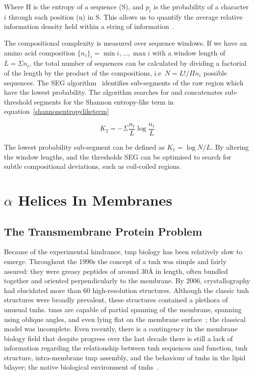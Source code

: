 Where H is the entropy of a sequence (S), and $p_i$ is the probability of a character $i$ through each position (n) in S. This allows us to quantify the average relative information density held within a string of information~\cite{Shannon1948}.

The compositional complexity is measured over sequence windows. If we have an amino acid composition $\{{{n}_{i}}{\}}_{i}={\min{i}},\ldots,{\max{i}}$ with a window length of $L=\Sigma {n}_i $, the total number of sequences can be calculated by dividing a factorial of the length by the product of the compositions, i.e\  $ N = L!/\Pi{n}_i $ possible sequences.
The SEG algorithm~\cite{WOOTTON1994269, Wootton1996} identifies sub-segments of the raw region which have the lowest probability.
The algorithm searches for and concatenates sub-threshold segments for the Shannon entropy-like term in equation~\ref{shannonentropyliketerm}

\begin{equation} \label{shannonentropyliketerm}
{K}_{2}=-\Sigma\frac{n_i}{L}\log\frac{n_i}{L}
\end{equation}

The lowest probability sub-segment can be defined as $ K_1=\log N/L $.
By altering the window lengths, and the thresholds SEG can be optimised to search for subtle compositional deviations, such as coil-coiled regions.

\section{$\alpha$ Helices In Membranes }

\subsection{The Transmembrane Protein Problem}
Because of the experimental hindrance, \gls{tmp} biology has been relatively slow to emerge.
Throughout the 1990s the concept of a \gls{tmh} was simple and fairly assured: they were greasy peptides of around 30{\AA} in length, often bundled together and oriented perpendicularly to the membrane.
By 2006, crystallography had elucidated more than 60 high-resolution structures.
Although the classic \gls{tmh} structures were broadly prevalent, these structures contained a plethora of unusual \gls{tmh}s.
\gls{tms}s are capable of partial spanning of the membrane, spanning using oblique angles, and even lying flat on the membrane surface~\cite{VonHeijne2006, Elofsson2007}; the classical model was incomplete.
Even recently, there is a contingency in the  membrane biology field that despite progress over the last decade there is still a lack of information regarding the relationship between \gls{tmh} sequences and function, \gls{tmh} structure, intra-membrane \gls{tmp} assembly, and the behaviour of \gls{tmh}s in the lipid bilayer; the native biological environment of \gls{tmh}s~\cite{Ladokhin2015}.

